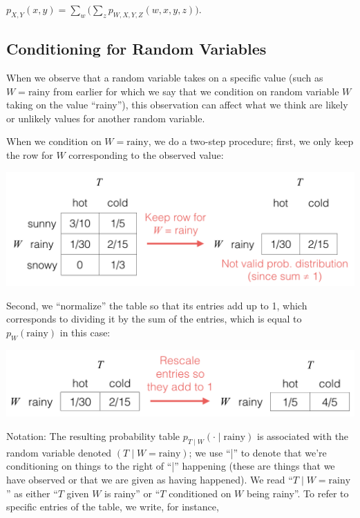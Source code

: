 \documentclass[6008notes.tex]{subfiles}
\begin{document}
$p_{X,Y}(x, y) = \sum _ w \Big( \sum _ z p_{W,X,Y,Z}(w,x,y,z) \Big).$
 
\subsection{Conditioning for Random Variables}

When we observe that a random variable takes on a specific value (such as $W=\text {rainy}$ from earlier for which we say that we condition on random variable $W$ taking on the value ``rainy''), this observation can affect what we think are likely or unlikely values for another random variable.

When we condition on $W=\text {rainy}$, we do a two-step procedure; first, we only keep the row for $W$ corresponding to the observed value:

{\centering\includegraphics[scale=0.4]{images_sec-joint-rv-cond-restrict}}

Second, we ``normalize'' the table so that its entries add up to 1, which corresponds to dividing it by the sum of the entries, which is equal to $p_{W}(\text {rainy})$ in this case:

{\centering\includegraphics[scale=0.4]{images_sec-joint-rv-cond-renormalize}}

Notation: The resulting probability table $p_{T\mid W}(\cdot \mid \text {rainy})$ is associated with the random variable denoted $(T\mid W=\text {rainy})$; we use ``|'' to denote that we're conditioning on things to the right of ``|'' happening (these are things that we have observed or that we are given as having happened). We read ``$T\mid W=\text {rainy}$'' as either ``$T$ given $W$ is rainy'' or ``$T$ conditioned on $W$ being rainy''. To refer to specific entries of the table, we write, for instance,
\end{document}
